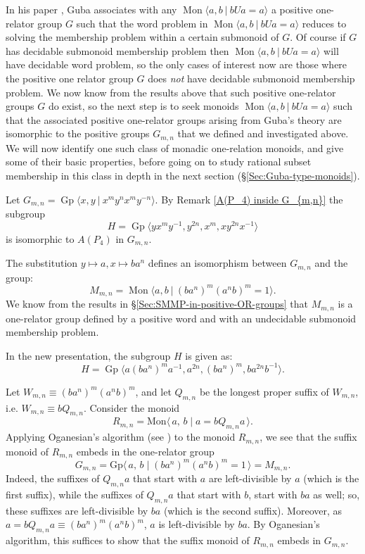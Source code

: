 \documentclass{amsart}
\newcommand{\Mpres}[2]{\operatorname{Mon}\bigl\langle #1\:|\:#2 \bigr\rangle}
\newcommand{\Ggen}[1]{\operatorname{Gp}\bigl\langle #1 \bigr\rangle}
\newcommand{\Gpres}[2]{\operatorname{Gp}\bigl\langle #1\:|\:#2 \bigr\rangle}
\theoremstyle{plain}
\theoremstyle{definition}
\begin{document}
In his paper \cite{Guba1997}, Guba associates with any $\Mpres{a,b}{bUa=a}$ a positive one-relator group $G$ such that the word problem in $\Mpres{a,b}{bUa=a}$ reduces to solving the membership problem within a certain submonoid of $G$.
Of course if $G$ has decidable submonoid membership problem then $\Mpres{a,b}{bUa=a}$ will have decidable word problem, so the only cases of interest now are those where the positive one relator group $G$ does \emph{not} have decidable submonoid membership problem. We now know from the results above that such positive one-relator groups $G$ do exist, so the next step is to seek monoids $\Mpres{a,b}{bUa=a}$ such that the associated positive one-relator groups arising from Guba's theory are isomorphic to the positive groups $G_{m,n}$ that we defined and investigated above. We will now identify one such class of monadic one-relation monoids, and give some of their basic properties, before going on to study rational subset membership in this class in depth in the next section (\S\ref{Sec:Guba-type-monoids}).

Let $G_{m,n} = \Gpres{x,y}{x^my^nx^my^{-n}}$. By Remark \ref{A(P_4) inside G_{m,n}} the subgroup 
\[
H = \Ggen{yx^my^{-1}, y^{2n}, x^m,xy^{2n}x^{-1}}
\]
is isomorphic to $A(P_4)$ in $G_{m,n}$.

The substitution $y \mapsto a, x \mapsto ba^n$ defines an isomorphism between $G_{m,n}$ and the group:
\[
M_{m,n} = \Mpres{a, b}{(b a^n)^m(a^n b)^m = 1}.
\]
We know from the results in \S\ref{Sec:SMMP-in-positive-OR-groups} that $M_{m,n}$ is a one-relator group defined by a positive word and with an undecidable submonoid membership problem. 

In the new presentation, the subgroup $H$ is given as: 
\[
H = \Ggen{a(ba^n)^ma^{-1}, a^{2n}, (ba^n)^m, ba^{2n}b^{-1}}.
\]

Let $W_{m,n} \equiv (b a^n)^m(a^n b)^m$, and let $Q_{m,n}$ be the longest proper suffix of $W_{m,n}$, i.e. $W_{m,n} \equiv b Q_{m,n}$. Consider the monoid 
\[
R_{m,n} = \text{Mon}\langle \, a,\, b \mid a = bQ_{m,n}a \,\rangle.
\]
Applying Oganesian's algorithm (see \cite{Guba1997}) to the monoid 
$R_{m,n}$, we see that the suffix monoid of $R_{m,n}$ embeds in the one-relator group 
\[
G_{m,n} = \text{Gp}\langle \, a,\, b \mid (b a^n)^m(a^n b)^m = 1\,\rangle = M_{m,n}.
\]
Indeed, the suffixes of $Q_{m,n}a$ that start with $a$ are left-divisible by $a$ (which is the first suffix), while the suffixes of $Q_{m,n}a$ that start with $b$, start with $ba$ as well; so, these suffixes are left-divisible by $ba$ (which is the second suffix). Moreover, as $a = bQ_{m,n}a \equiv (ba^n)^m(a^nb)^m$, $a$ is left-divisible by $ba$. By Oganesian's algorithm, this suffices to show that the suffix monoid of $R_{m,n}$ embeds in $G_{m,n}$. 
\end{document}
